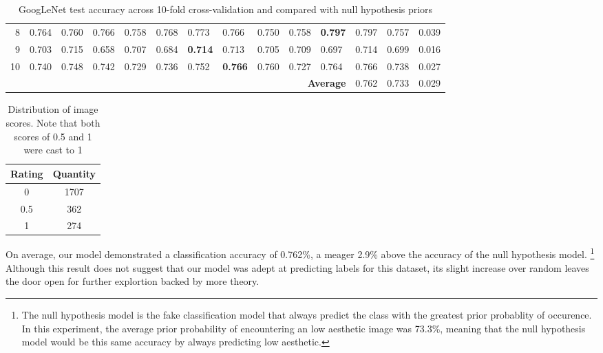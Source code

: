 \documentclass[midd]{thesis}
\begin{document}
\begin{table}[h]
{\begin{tabular}{@{}rlllllllllllll@{}}
\multicolumn{1}{r|}{8} & 0.764 & 0.760 & 0.766 & 0.758 & 0.768 & 0.773 & 0.766 & 0.750 & 0.758 & \multicolumn{1}{l|}{\textbf{0.797}} & 0.797 & 0.757 & 0.039 \\
\multicolumn{1}{r|}{9} & 0.703 & 0.715 & 0.658 & 0.707 & 0.684 & \textbf{0.714} & 0.713 & 0.705 & 0.709 & \multicolumn{1}{l|}{0.697} & 0.714 & 0.699 & 0.016 \\
\multicolumn{1}{r|}{10} & 0.740 & 0.748 & 0.742 & 0.729 & 0.736 & 0.752 & \textbf{0.766} & 0.760 & 0.727 & \multicolumn{1}{l|}{0.764} & 0.766 & 0.738 & 0.027 \\ \midrule
\multicolumn{1}{l}{\textbf{}} &  &  &  &  &  &  &  & \multicolumn{3}{r|}{\textbf{Average}} & 0.762 & 0.733 & 0.029 \\ \bottomrule
\end{tabular}
}
\caption{GoogLeNet test accuracy across 10-fold cross-validation and compared with null hypothesis priors}
\label{results}
\end{table}

\begin{table}[h]
\centering
\begin{tabular}{@{}cc@{}}
\toprule
\multicolumn{1}{l}{Rating} & \multicolumn{1}{l}{Quantity} \\ \midrule
0 & 1707 \\
0.5 & 362 \\
1 & 274 \\ \bottomrule
\end{tabular}
\caption{Distribution of image scores. Note that both scores of 0.5 and 1 were cast to 1}
\label{score-distribution}
\end{table}

On average, our model demonstrated a classification accuracy of 0.762\%, a meager 2.9\% above the accuracy of the null hypothesis model. \footnote{The null hypothesis model is the fake classification model that always predict the class with the greatest prior probablity of occurence. In this experiment, the average prior probability of encountering an low aesthetic image was 73.3\%, meaning that the null hypothesis model would be this same accuracy by always predicting low aesthetic.} Although this result does not suggest that our model was adept at predicting labels for this dataset, its slight increase over random leaves the door open for further explortion backed by more theory.
\end{document}
